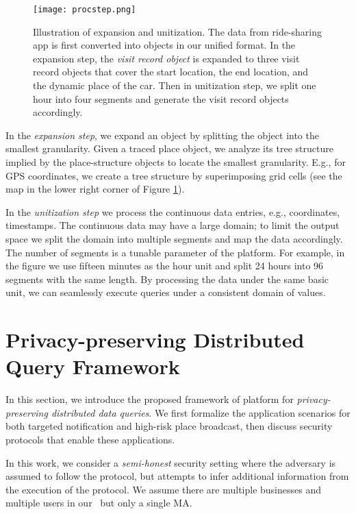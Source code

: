 \begin{figure}
\centering
\texttt{[image: procstep.png]}
\caption{Illustration of expansion and unitization. The data from ride-sharing app is first converted into objects in our unified format. In the expansion step, the \emph{visit record object} is expanded to three visit record objects that cover the start location, the end location, and the dynamic place of the car. Then in unitization step, we split one hour into four segments and generate the visit record objects accordingly.}
\label{procstep}
\end{figure}

In the \emph{expansion step}, we expand an object by splitting the object into the smallest granularity. 
Given a traced place object, we analyze its tree structure implied by the  place-structure objects to locate the smallest granularity.
E.g., for GPS coordinates, we create a tree structure by superimposing grid cells (see the map in the lower right corner of Figure \ref{procstep}). 
 

In the \emph{unitization step} we process the continuous data entries, e.g., coordinates, timestamps. 
The continuous data may have a large domain; to limit the output space we split the domain into multiple segments and map the data accordingly. 
The number of segments is a tunable parameter of the platform. 
For example, in the figure we use fifteen minutes as the hour unit and split 24 hours into 96 segments with the same length. 
By processing the data under the same basic unit, we can seamlessly execute queries under a consistent domain of values.




\section{Privacy-preserving Distributed Query Framework}
\label{ppframework}

In this section, we introduce the proposed framework of platform \sysname for \emph{privacy-preserving distributed data queries}. We first formalize the application scenarios for both targeted notification and high-risk place broadcast, then discuss security protocols that enable these applications. %

In this work, we consider a \emph{semi-honest} security setting where the adversary is assumed to follow the protocol, but attempts to infer additional information from the execution of the protocol. We assume there are multiple businesses and multiple users in our \sysname\ but only a single MA. %

